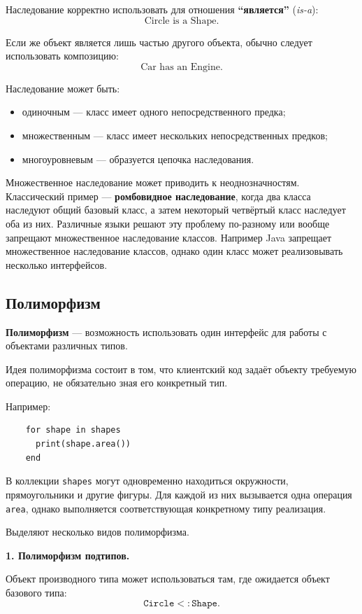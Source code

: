 Наследование корректно использовать для отношения \textbf{``является''} (\textit{is-a}):
\[
\text{Circle is a Shape}.
\]

Если же объект является лишь частью другого объекта, обычно следует использовать композицию:
\[
\text{Car has an Engine}.
\]

Наследование может быть:
\begin{itemize}
	\item одиночным --- класс имеет одного непосредственного предка;
	\item множественным --- класс имеет нескольких непосредственных предков;
	\item многоуровневым --- образуется цепочка наследования.
\end{itemize}

Множественное наследование может приводить к неоднозначностям. Классический пример --- \textbf{ромбовидное наследование}, когда два класса наследуют общий базовый класс, а затем некоторый четвёртый класс наследует оба из них. Различные языки решают эту проблему по-разному или вообще запрещают множественное наследование классов. Например Java запрещает множественное наследование классов, однако один класс может реализовывать несколько интерфейсов.

\subsection{Полиморфизм}

\textbf{Полиморфизм} --- возможность использовать один интерфейс для работы с объектами различных типов.

Идея полиморфизма состоит в том, что клиентский код задаёт объекту требуемую операцию, не обязательно зная его конкретный тип.

Например:
\begin{verbatim}
	for shape in shapes
	  print(shape.area())
	end
\end{verbatim}

В коллекции \texttt{shapes} могут одновременно находиться окружности, прямоугольники и другие фигуры. Для каждой из них вызывается одна операция \texttt{area}, однако выполняется соответствующая конкретному типу реализация.

Выделяют несколько видов полиморфизма.

\textbf{1. Полиморфизм подтипов.}

Объект производного типа может использоваться там, где ожидается объект базового типа:
\[
\texttt{Circle} <: \texttt{Shape}.
\]

